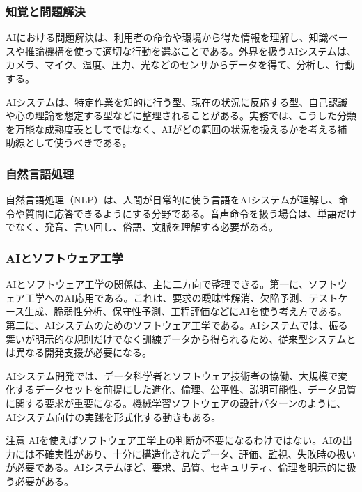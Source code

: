 \documentclass[a4paper,11pt]{ltjsarticle}
\numberwithin{figure}{section}
\numberwithin{table}{section}
\begin{document}
\subsubsection{知覚と問題解決}

AIにおける問題解決は、利用者の命令や環境から得た情報を理解し、知識ベースや推論機構を使って適切な行動を選ぶことである。外界を扱うAIシステムは、カメラ、マイク、温度、圧力、光などのセンサからデータを得て、分析し、行動する。

AIシステムは、特定作業を知的に行う型、現在の状況に反応する型、自己認識や心の理論を想定する型などに整理されることがある。実務では、こうした分類を万能な成熟度表としてではなく、AIがどの範囲の状況を扱えるかを考える補助線として使うべきである。

\subsubsection{自然言語処理}

自然言語処理（NLP）は、人間が日常的に使う言語をAIシステムが理解し、命令や質問に応答できるようにする分野である。音声命令を扱う場合は、単語だけでなく、発音、言い回し、俗語、文脈を理解する必要がある。

\subsubsection{AIとソフトウェア工学}

AIとソフトウェア工学の関係は、主に二方向で整理できる。第一に、ソフトウェア工学へのAI応用である。これは、要求の曖昧性解消、欠陥予測、テストケース生成、脆弱性分析、保守性予測、工程評価などにAIを使う考え方である。第二に、AIシステムのためのソフトウェア工学である。AIシステムでは、振る舞いが明示的な規則だけでなく訓練データから得られるため、従来型システムとは異なる開発支援が必要になる。

AIシステム開発では、データ科学者とソフトウェア技術者の協働、大規模で変化するデータセットを前提にした進化、倫理、公平性、説明可能性、データ品質に関する要求が重要になる。機械学習ソフトウェアの設計パターンのように、AIシステム向けの実践を形式化する動きもある。

\begin{pointbox}{注意}
AIを使えばソフトウェア工学上の判断が不要になるわけではない。AIの出力には不確実性があり、十分に構造化されたデータ、評価、監視、失敗時の扱いが必要である。AIシステムほど、要求、品質、セキュリティ、倫理を明示的に扱う必要がある。

\end{pointbox}
\end{document}
